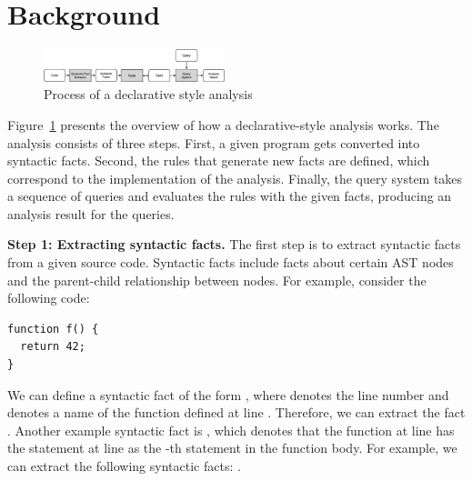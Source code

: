 \section{Background}\label{sec:background} 
\begin{figure}[t]
  \centering
  \vspace{2mm}
  \includegraphics[width=0.47\textwidth]{img/ov1.png}
  \caption{Process of a declarative style analysis}
  \label{fig:ov1}
\end{figure}

Figure~\ref{fig:ov1} presents the overview of how a declarative-style
analysis works.  The analysis consists of three steps.  First, a given program
gets converted into syntactic facts.  Second, the rules that generate new facts
are defined, which correspond to the implementation of the analysis.  Finally,
the query system takes a sequence of queries and evaluates the rules with the
given facts, producing an analysis result for the queries.


\textbf{Step 1: Extracting syntactic facts.}
The first step is to extract syntactic facts from a given source code.
Syntactic facts include facts about certain AST nodes and
the parent-child relationship between nodes. For example, consider
the following code:

\begin{lstlisting}[style=mcpp]
function f() {
  return 42;
}
\end{lstlisting}
We can define a syntactic fact of the form , where
 denotes the line number and  denotes a name of the function
defined at line .  Therefore, we can extract the fact .  Another example syntactic fact is , which denotes that the function at line  has the statement
at line  as the -th statement in the function body.  For
example, we can extract the following syntactic facts: .

